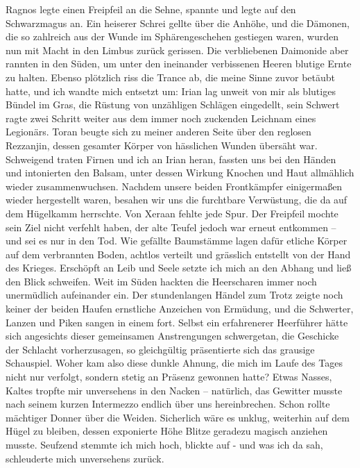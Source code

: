 Ragnos legte einen Freipfeil an die Sehne, spannte und legte auf den Schwarzmagus an. Ein heiserer Schrei gellte über die Anhöhe, und die Dämonen, die so zahlreich aus der Wunde im Sphärengeschehen gestiegen waren, wurden nun mit Macht in den Limbus zurück gerissen. Die verbliebenen Daimonide aber rannten in den Süden, um unter den ineinander verbissenen Heeren blutige Ernte zu halten. Ebenso plötzlich riss die Trance ab, die meine Sinne zuvor betäubt hatte, und ich wandte mich entsetzt um: Irian lag unweit von mir als blutiges Bündel im Gras, die Rüstung von unzähligen Schlägen eingedellt, sein Schwert ragte zwei Schritt weiter aus dem immer noch zuckenden Leichnam eines Legionärs. Toran beugte sich zu meiner anderen Seite über den reglosen Rezzanjin, dessen gesamter Körper von hässlichen Wunden übersäht war. Schweigend traten Firnen und ich an Irian heran, fassten uns bei den Händen und intonierten den Balsam, unter dessen Wirkung Knochen und Haut allmählich wieder zusammenwuchsen. Nachdem unsere beiden Frontkämpfer einigermaßen wieder hergestellt waren, besahen wir uns die furchtbare Verwüstung, die da auf dem Hügelkamm herrschte. Von Xeraan fehlte jede Spur. Der Freipfeil mochte sein Ziel nicht verfehlt haben, der alte Teufel jedoch war erneut entkommen -- und sei es nur in den Tod. Wie gefällte Baumstämme lagen dafür etliche Körper auf dem verbrannten Boden, achtlos verteilt und grässlich entstellt von der Hand des Krieges. Erschöpft an Leib und Seele setzte ich mich an den Abhang und ließ den Blick schweifen. Weit im Süden hackten die Heerscharen immer noch unermüdlich aufeinander ein. Der stundenlangen Händel zum Trotz zeigte noch keiner der beiden Haufen ernstliche Anzeichen von Ermüdung, und die Schwerter, Lanzen und Piken sangen in einem fort. Selbst ein erfahrenerer Heerführer hätte sich angesichts dieser gemeinsamen Anstrengungen schwergetan, die Geschicke der Schlacht vorherzusagen, so gleichgültig präsentierte sich das grausige Schauspiel. Woher kam also diese dunkle Ahnung, die mich im Laufe des Tages nicht nur verfolgt, sondern stetig an Präsenz gewonnen hatte? Etwas Nasses, Kaltes tropfte mir unversehens in den Nacken -- natürlich, das Gewitter musste nach seinem kurzen Intermezzo endlich über uns hereinbrechen. Schon rollte mächtiger Donner über die Weiden. Sicherlich wäre es unklug, weiterhin auf dem Hügel zu bleiben, dessen exponierte Höhe Blitze geradezu magisch anziehen musste. Seufzend stemmte ich mich hoch, blickte auf - und was ich da sah, schleuderte mich unversehens zurück.

